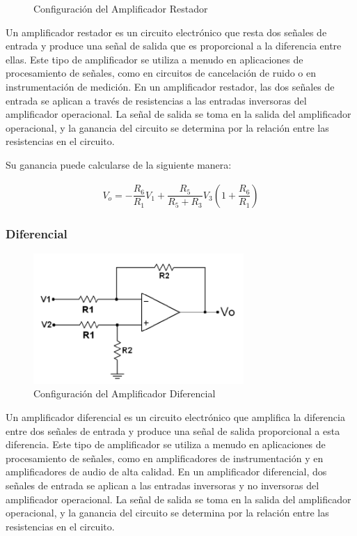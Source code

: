             \begin{figure}[H]
              \centering              
              \caption{Configuración del Amplificador Restador}
              \label{fig:restador0}
            \end{figure}

            Un amplificador restador es un circuito electrónico que resta dos señales de entrada y produce una señal de salida que es proporcional a la diferencia entre ellas. Este tipo de amplificador se utiliza a menudo en aplicaciones de procesamiento de señales, como en circuitos de cancelación de ruido o en instrumentación de medición. En un amplificador restador, las dos señales de entrada se aplican a través de resistencias a las entradas inversoras del amplificador operacional. La señal de salida se toma en la salida del amplificador operacional, y la ganancia del circuito se determina por la relación entre las resistencias en el circuito. 
            
            Su ganancia puede calcularse de la siguiente manera: 

            \begin{gather}
                V_o=-\dfrac{R_6}{R_1}V_1+\dfrac{R_5}{R_5+R_3}V_3\left(1+\dfrac{R_6}{R_1}\right) 
            \end{gather}

        \subsubsection{Diferencial}

            \begin{figure}[H]
                \centering
                \includegraphics[width=8cm]{Imagenes/diferencial.png}
                \caption{Configuración del Amplificador Diferencial}
                \label{fig:diferencial0}
            \end{figure}

            Un amplificador diferencial es un circuito electrónico que amplifica la diferencia entre dos señales de entrada y produce una señal de salida proporcional a esta diferencia. Este tipo de amplificador se utiliza a menudo en aplicaciones de procesamiento de señales, como en amplificadores de instrumentación y en amplificadores de audio de alta calidad. En un amplificador diferencial, dos señales de entrada se aplican a las entradas inversoras y no inversoras del amplificador operacional. La señal de salida se toma en la salida del amplificador operacional, y la ganancia del circuito se determina por la relación entre las resistencias en el circuito. 
            
